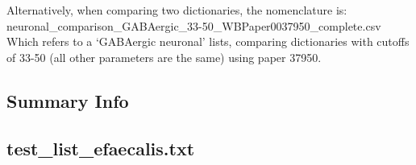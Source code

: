 \documentclass{article}
\begin{document}
Alternatively, when comparing two dictionaries, the nomenclature is:
neuronal\_comparison\_GABAergic\_33-50_WBPaper0037950_complete.csv
Which refers to a `GABAergic neuronal' lists, comparing dictionaries with cutoffs of 33-50 (all other parameters are the same) using paper 37950. 

\subsection*{Summary Info}

\subsection*{test_list_efaecalis.txt}



\end{document}
